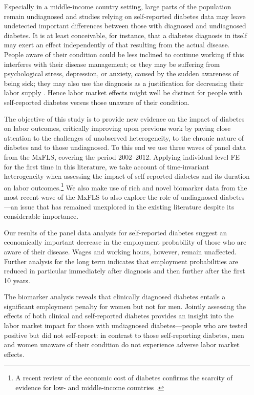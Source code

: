 \documentclass[12pt,english]{article}
\begin{document}
Especially in a middle-income country setting, large parts of the population remain undiagnosed \parencite{Beagley2014} and studies relying on self-reported diabetes data may leave undetected important differences between those with diagnosed and undiagnosed diabetes. It is at least conceivable, for instance, that a diabetes diagnosis in itself may exert an effect independently of that resulting from the actual disease. People aware of their condition could be less inclined to continue working if this interferes with their disease management; or they may be suffering from psychological stress, depression, or anxiety, caused by the sudden awareness of being sick; they may also use the diagnosis as a justification for decreasing their labor supply \parencite{Kapteyn2009}. Hence labor market effects might well be distinct for people with self-reported diabetes versus those unaware of their condition.

The objective of this study is to provide new evidence on the impact of diabetes on labor outcomes, critically improving upon previous work by paying close attention to the challenges of unobserved heterogeneity, to the chronic nature of diabetes and to those undiagnosed. To this end we use three waves of panel data from the \acf{MxFLS}, covering the period 2002--2012. Applying individual level \acf{FE} for the first time in this literature, we take account of time-invariant heterogeneity when assessing the impact of self-reported diabetes and its duration on labor outcomes.\footnote{A recent review of the economic cost of diabetes confirms the scarcity of evidence for low- and middle-income countries \parencite{Seuring2015a}.} We also make use of rich and novel biomarker data from the most recent wave of the \ac{MxFLS} to also explore the role of undiagnosed diabetes---an issue that has remained unexplored in the existing literature despite its considerable importance.

Our results of the panel data analysis for self-reported diabetes suggest an economically important decrease in the employment probability of those who are aware of their disease. Wages and working hours, however, remain unaffected. Further analysis for the long term indicates that employment probabilities are reduced in particular immediately after diagnosis and then further after the first 10 years.

The biomarker analysis reveals that clinically diagnosed diabetes entails a significant employment penalty for women but not for men. Jointly assessing the effects of both clinical and self-reported diabetes provides an insight into the labor market impact for those with undiagnosed diabetes---people who are tested positive but did not self-report: in contrast to those self-reporting diabetes, men and women unaware of their condition do not experience adverse labor market effects.	 
\end{document}
